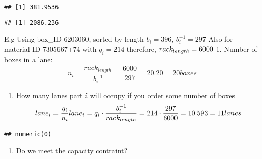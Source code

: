\documentclass[
]{article}
\newenvironment{Shaded}{\begin{snugshade}}{\end{snugshade}}
\newcommand{\DecValTok}[1]{\textcolor[rgb]{0.00,0.00,0.81}{#1}}
\newcommand{\KeywordTok}[1]{\textcolor[rgb]{0.13,0.29,0.53}{\textbf{#1}}}
\newcommand{\NormalTok}[1]{#1}
\newcommand{\OperatorTok}[1]{\textcolor[rgb]{0.81,0.36,0.00}{\textbf{#1}}}
\newcommand{\StringTok}[1]{\textcolor[rgb]{0.31,0.60,0.02}{#1}}
\providecommand{\tightlist}{%
  \setlength{\itemsep}{0pt}\setlength{\parskip}{0pt}}
\begin{document}
\begin{verbatim}
## [1] 381.9536
\end{verbatim}

\begin{Shaded}
\end{Shaded}

\begin{verbatim}
## [1] 2086.236
\end{verbatim}

E.g Using box\_ID 6203060, sorted by length \(b_i=396\),
\(b_i^{-1}=297\) Also for material ID 7305667+74 with \(q_i=214\)
therefore, \(rack_{length}=6000 \\\) 1. Number of boxes in a lane:
\[n_i=\frac {rack_{length}}{b_i^{-1}}=\frac {6000}{297}=20.20=20boxes\]

\begin{enumerate}
\def\labelenumi{\arabic{enumi}.}
\setcounter{enumi}{1}
\tightlist
\item
  How many lanes part \(i\) will occupy if you order some number of
  boxes
  \[lane_i=\frac {q_i}{n_i}\\lane_i=q_i \cdot \frac {b_i^{-1}}{rack_{length}}=214 \cdot \frac {297}{6000}=10.593= 11 \space lanes \]
\end{enumerate}

\begin{Shaded}
\end{Shaded}

\begin{verbatim}
## numeric(0)
\end{verbatim}

\begin{enumerate}
\def\labelenumi{(\Alph{enumi})}
\setcounter{enumi}{2}
\tightlist
\item
  Do we meet the capacity contraint?
\end{enumerate}
\end{document}
